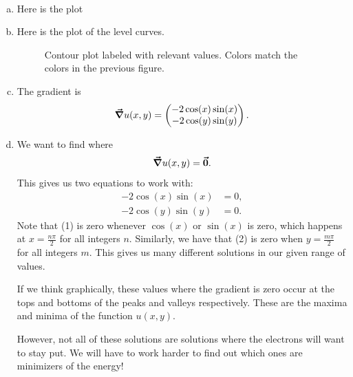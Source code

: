 \documentclass[12pt]{article} %
\begin{document}
\begin{solution}~
\begin{enumerate}[(a)]
    \item Here is the plot
    \begin{figure}[H]
        \centering
	\def\svgwidth{0.75\columnwidth}
	
    \end{figure}
    \item Here is the plot of the level curves.
    \begin{figure}[H]
        \centering
	\def\svgwidth{0.75\columnwidth}
	
        \caption{Contour plot labeled with relevant values. Colors match the colors in the previous figure.}
    \end{figure}
    
    \item The gradient is
    \[
    \boldsymbol{\vec{\nabla}} u(x,y) = \begin{pmatrix} -2\cos(x)\sin(x) \\ -2\cos(y)\sin(y) \end{pmatrix}.
    \]
    \item We want to find where
    \[
    \boldsymbol{\vec{\nabla}} u(x,y) = \boldsymbol{\vec{0}}.
    \]
    This gives us two equations to work with:
    \begin{align}
        -2\cos(x)\sin(x) &= 0,\\
        -2\cos(y)\sin(y) &= 0.
    \end{align}
    Note that (1) is zero whenever $\cos(x)$ or $\sin(x)$ is zero, which happens at $x=\frac{n\pi}{2}$ for all integers $n$. Similarly, we have that (2) is zero when $y=\frac{m\pi}{2}$ for all integers $m$.  This gives us many different solutions in our given range of values.
    
    If we think graphically, these values where the gradient is zero occur at the tops and bottoms of the peaks and valleys respectively.  These are the maxima and minima of the function $u(x,y)$.
    
    However, not all of these solutions are solutions where the electrons will want to stay put.  We will have to work harder to find out which ones are minimizers of the energy!
\end{enumerate}
\end{solution}
\end{document}
